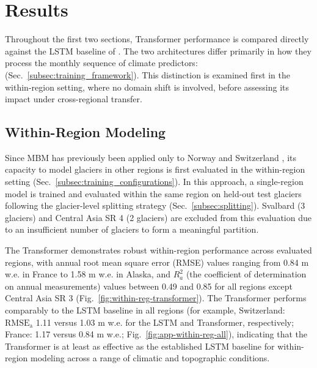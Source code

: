 \documentclass[draft]{agujournal2019}
\begin{document}
\section{Results}\label{sec:results}
Throughout the first two sections, Transformer performance is compared directly against the LSTM baseline of \citet{vanderMeer_2026}. The two architectures differ primarily in how they process the monthly sequence of climate predictors:  (Sec.~\ref{subsec:training_framework}). This distinction is examined first in the within-region setting, where no domain shift is involved, before assessing its impact under cross-regional transfer.


\subsection{Within-Region Modeling}\label{subsec:within-region}

Since MBM has previously been applied only to Norway \citep{Sjursen2025} and Switzerland \citep{vanderMeer_2026}, its capacity to model glaciers in other regions is first evaluated in the within-region setting (Sec.~\ref{subsec:training_configurations}). In this approach, a single-region model is trained and evaluated within the same region on held-out test glaciers following the glacier-level splitting strategy  (Sec.~\ref{subsec:splitting}). Svalbard (3 glaciers) and Central Asia SR 4 (2 glaciers) are excluded from this evaluation due to an insufficient number of glaciers to form a meaningful partition.

The Transformer demonstrates robust within-region performance across  evaluated regions, with annual root mean square error (RMSE) values ranging from 0.84 m w.e. in France to 1.58 m w.e. in Alaska, and $R^2_a$ (the coefficient of determination on annual measurements) values between 0.49 and 0.85 for all regions except Central Asia SR 3 (Fig.~\ref{fig:within-reg-transformer}). The Transformer performs comparably to the LSTM baseline \citep{vanderMeer_2026} in all regions (for example, Switzerland: $\mathrm{RMSE_a}$ 1.11 versus 1.03 m w.e. for the LSTM and Transformer, respectively; France: 1.17 versus 0.84 m w.e.; Fig.~\ref{fig:app-within-reg-all}), indicating that the Transformer is at least as effective as the established LSTM baseline for within-region modeling across a range of climatic and topographic conditions.
\end{document}
